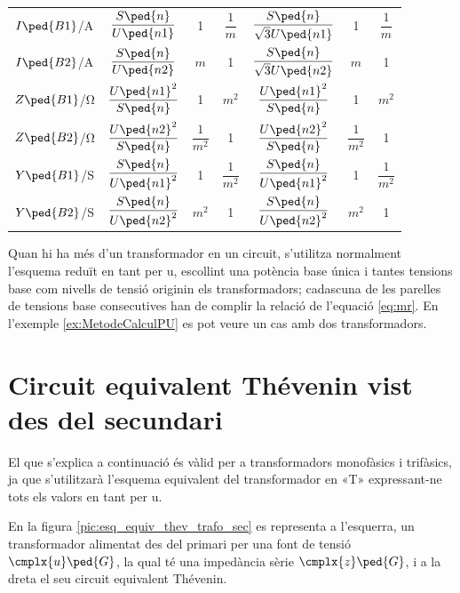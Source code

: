 \begin{ThreePartTable}
\begin{longtable}{ccccccc}
$I\ped{B1}$/\unit{A} & $\dfrac{S\ped{n}}{U\ped{n1}}$ & 1 & $\dfrac{1}{m}$ & $\dfrac{S\ped{n}}{\sqrt{3}U\ped{n1}}$ & 1  & $\dfrac{1}{m}$\\[0.4cm]
$I\ped{B2}$/\unit{A} & $\dfrac{S\ped{n}}{U\ped{n2}}$  & $m$ & 1 & $\dfrac{S\ped{n}}{\sqrt{3}U\ped{n2}}$   & $m$ & 1\\[0.4cm]
$Z\ped{B1}$/\unit{\ohm} & $\dfrac{U\ped{n1}^2}{S\ped{n}}$ & 1 & $m^2$ & $\dfrac{U\ped{n1}^2}{S\ped{n}}$ & 1 & $m^2$\\[0.4cm]
$Z\ped{B2}$/\unit{\ohm} & $\dfrac{U\ped{n2}^2}{S\ped{n}}$  & $\dfrac{1}{m^2}$ & 1& $\dfrac{U\ped{n2}^2}{S\ped{n}}$  & $\dfrac{1}{m^2}$ & 1\\[0.4cm]
$Y\ped{B1}$/\unit{S} & $\dfrac{S\ped{n}}{U\ped{n1}^2}$ & 1 & $\dfrac{1}{m^2}$ & $\dfrac{S\ped{n}}{U\ped{n1}^2}$ & 1 & $\dfrac{1}{m^2}$ \\[0.4cm]
$Y\ped{B2}$/\unit{S} & $\dfrac{S\ped{n}}{U\ped{n2}^2}$  & $m^2$ & 1 & $\dfrac{S\ped{n}}{U\ped{n2}^2}$ &$m^2$ &  1\\[0.4cm]
\bottomrule[1pt]
\end{longtable}
\end{ThreePartTable}


Quan hi ha més d'un transformador en un circuit, s'utilitza normalment l'esquema reduït en tant per u, escollint una potència base única i tantes tensions base com nivells de tensió  originin els transformadors; cadascuna de les parelles de tensions base consecutives han de complir la relació de l'equació \eqref{eq:mr}. En l'exemple \vref{ex:MetodeCalculPU} es pot veure un cas amb dos transformadors.

\section{Circuit equivalent Thévenin vist des del secundari}\label{sec:trafo-thevenin}

El que s'explica a continuació és vàlid per a transformadors
monofàsics i trifàsics, ja que s'utilitzarà l'esquema equivalent del
transformador en «T» expressant-ne tots els valors en tant per u.

En la figura \vref{pic:esq_equiv_thev_trafo_sec}  es representa a
l'esquerra, un transformador alimentat des del primari per una font
de tensió $\cmplx{u}\ped{G}$, la qual té una impedància sèrie
$\cmplx{z}\ped{G}$, i a  la dreta el seu circuit equivalent
Thévenin.

\begin{center}
    
    \label{pic:esq_equiv_thev_trafo_sec}
\end{center}

